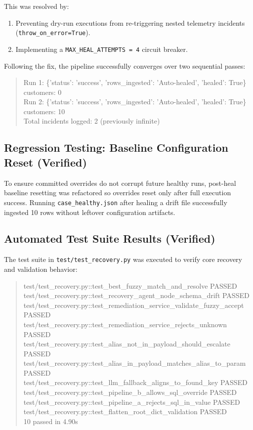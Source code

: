 \documentclass[11pt]{article}
\newcommand{\code}[1]{\texttt{\small #1}}
\newenvironment{logblock}{%
  \par\noindent\footnotesize\ttfamily
  \begin{quote}\noindent
}{%
  \end{quote}\normalfont\normalsize
}
\begin{document}
This was resolved by:
\begin{enumerate}
  \item Preventing dry-run executions from re-triggering nested telemetry incidents (\code{throw\_on\_error=True}).
  \item Implementing a \code{MAX\_HEAL\_ATTEMPTS = 4} circuit breaker.
\end{enumerate}

Following the fix, the pipeline successfully converges over two sequential passes:
\begin{logblock}
Run 1: \{'status': 'success', 'rows\_ingested': 'Auto-healed', 'healed': True\} \quad customers: 0\\
Run 2: \{'status': 'success', 'rows\_ingested': 'Auto-healed', 'healed': True\} \quad customers: 10\\[4pt]
Total incidents logged: 2 (previously infinite)
\end{logblock}

\subsection{Regression Testing: Baseline Configuration Reset (Verified)}
To ensure committed overrides do not corrupt future healthy runs, post-heal baseline resetting was refactored so overrides reset only after full execution success. Running \code{case\_healthy.json} after healing a drift file successfully ingested 10 rows without leftover configuration artifacts.

\subsection{Automated Test Suite Results (Verified)}
The test suite in \code{test/test\_recovery.py} was executed to verify core recovery and validation behavior:

\begin{logblock}
test/test\_recovery.py::test\_best\_fuzzy\_match\_and\_resolve PASSED\\
test/test\_recovery.py::test\_recovery\_agent\_node\_schema\_drift PASSED\\
test/test\_recovery.py::test\_remediation\_service\_validate\_fuzzy\_accept PASSED\\
test/test\_recovery.py::test\_remediation\_service\_rejects\_unknown PASSED\\
test/test\_recovery.py::test\_alias\_not\_in\_payload\_should\_escalate PASSED\\
test/test\_recovery.py::test\_alias\_in\_payload\_matches\_alias\_to\_param PASSED\\
test/test\_recovery.py::test\_llm\_fallback\_aligns\_to\_found\_key PASSED\\
test/test\_recovery.py::test\_pipeline\_b\_allows\_sql\_override PASSED\\
test/test\_recovery.py::test\_pipeline\_a\_rejects\_sql\_in\_value PASSED\\
test/test\_recovery.py::test\_flatten\_root\_dict\_validation PASSED\\[4pt]
10 passed in 4.90s
\end{logblock}
\end{document}
